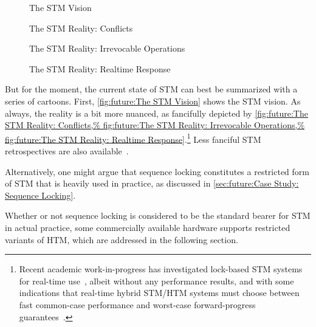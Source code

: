 \begin{figure}
\centering
{}
\caption{The STM Vision}
\end{figure}

\begin{figure}
\centering
{}
\caption{The STM Reality:
			  Conflicts}
\end{figure}

\begin{figure}
\centering
{}
\caption{The STM Reality:
			  Irrevocable Operations}
\end{figure}

\begin{figure}
\centering
{}
\caption{The STM Reality:
			  Realtime Response}
\end{figure}

But for the moment, the current state of STM
can best be summarized with a series of cartoons.
First,
\cref{fig:future:The STM Vision}
shows the STM vision.
As always, the reality is a bit more nuanced, as fancifully depicted by
\cref{fig:future:The STM Reality: Conflicts,%
fig:future:The STM Reality: Irrevocable Operations,%
fig:future:The STM Reality: Realtime Response}.\footnote{
	Recent academic work-in-progress has investigated lock-based STM
	systems for real-time use~\cite{JimAnderson2019STMRT,CatherineNemitz2018LockSTMrealtime},
	albeit without any performance results, and with some indications
	that real-time hybrid STM/HTM systems must choose between fast
	common-case performance and worst-case forward-progress
	guarantees~\cite{DBLP:journals/corr/AlistarhKKRS14,MartinSchoeberl2010realtimeTM}.}
Less fanciful STM retrospectives are also
available~\cite{JoeDuffy2010RetroTM,JoeDuffy2010RetroTM2}.

Alternatively, one might argue that sequence locking constitutes a
restricted form of STM that is heavily used in practice, as discussed in
\cref{sec:future:Case Study: Sequence Locking}.

Whether or not sequence locking is considered to be the standard bearer
for STM in actual practice, some commercially available hardware supports
restricted variants of HTM, which are addressed in the following section.
